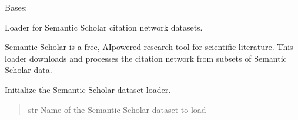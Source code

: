 \documentclass[letterpaper,10pt,english]{sphinxmanual}
\begin{document}
\begin{fulllineitems}
\label{\detokenize{graphem:graphem.datasets.SemanticScholarDataset}}
\pysigstartsignatures
{}
\pysigstopsignatures
\sphinxAtStartPar
Bases: {\hyperref[\detokenize{graphem:graphem.datasets.DatasetLoader}]{}}

\sphinxAtStartPar
Loader for Semantic Scholar citation network datasets.

\sphinxAtStartPar
Semantic Scholar is a free, AI\sphinxhyphen{}powered research tool for scientific literature.
This loader downloads and processes the citation network from subsets of Semantic Scholar data.

\begin{fulllineitems}
\label{\detokenize{graphem:graphem.datasets.SemanticScholarDataset.AVAILABLE_DATASETS}}
\pysigstartsignatures
{}
\pysigstopsignatures
\end{fulllineitems}


\begin{fulllineitems}
\label{\detokenize{graphem:graphem.datasets.SemanticScholarDataset.__init__}}
\pysigstartsignatures
{}
\pysigstopsignatures
\sphinxAtStartPar
Initialize the Semantic Scholar dataset loader.
\begin{quote}\begin{description}
\sphinxAtStartPar
{} \textendash{} str
Name of the Semantic Scholar dataset to load


\end{description}
\end{quote}
\end{fulllineitems}
\end{fulllineitems}
\end{document}

